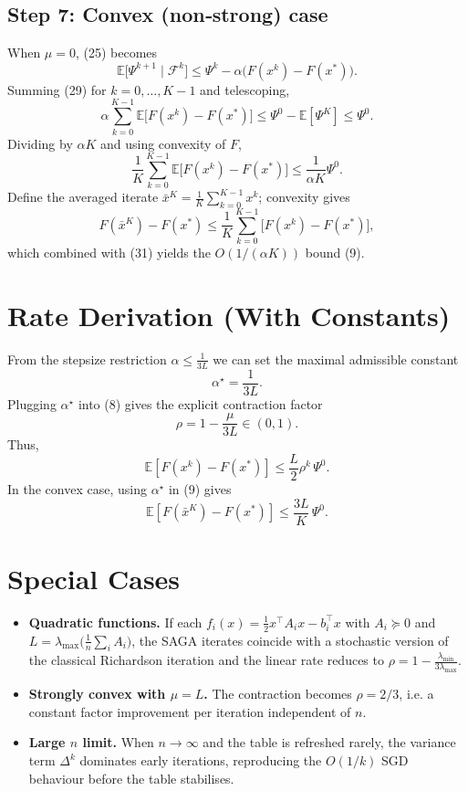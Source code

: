 \documentclass{article}
\newcommand{\E}{\mathbb{E}}
\begin{document}
\subsection*{Step 7: Convex (non‑strong) case}
When $\mu=0$, (25) becomes
\[
\E\!\bigl[\Psi^{k+1}\mid\mathcal{F}^{k}\bigr]
\le \Psi^{k}-\alpha\bigl(F(x^{k})-F(x^{*})\bigr).
\tag{29}
\]
Summing (29) for $k=0,\dots,K-1$ and telescoping,
\[
\alpha\sum_{k=0}^{K-1}\E\!\bigl[F(x^{k})-F(x^{*})\bigr]
\le \Psi^{0}-\E[\Psi^{K}]
\le \Psi^{0}.
\tag{30}
\]
Dividing by $\alpha K$ and using convexity of $F$,
\[
\frac{1}{K}\sum_{k=0}^{K-1}\E\!\bigl[F(x^{k})-F(x^{*})\bigr]
\le \frac{1}{\alpha K}\Psi^{0}.
\tag{31}
\]
Define the averaged iterate $\bar x^{K}= \frac1K\sum_{k=0}^{K-1}x^{k}$; convexity gives
\[
F(\bar x^{K})-F(x^{*})
\le \frac{1}{K}\sum_{k=0}^{K-1}\bigl[F(x^{k})-F(x^{*})\bigr],
\]
which combined with (31) yields the $O(1/(\alpha K))$ bound (9).

\section*{Rate Derivation (With Constants)}
From the stepsize restriction $\alpha\le \frac{1}{3L}$ we can set the maximal admissible constant
\[
\alpha^{\star}= \frac{1}{3L}.
\]
Plugging $\alpha^{\star}$ into (8) gives the explicit contraction factor
\[
\rho = 1-\frac{\mu}{3L}\in(0,1).
\]
Thus,
\[
\E[F(x^{k})-F(x^{*})]\le \frac{L}{2}\rho^{k}\,\Psi^{0}.
\]
In the convex case, using $\alpha^{\star}$ in (9) gives
\[
\E[F(\bar x^{K})-F(x^{*})]\le \frac{3L}{K}\,\Psi^{0}.
\]

\section*{Special Cases}
\begin{itemize}
\item \textbf{Quadratic functions.} If each $f_i(x)=\frac12 x^{\top}A_i x-b_i^{\top}x$ with $A_i\succeq 0$ and $L=\lambda_{\max}\!\bigl(\frac1n\sum_i A_i\bigr)$, the SAGA iterates coincide with a stochastic version of the classical Richardson iteration and the linear rate reduces to $\rho=1-\frac{\lambda_{\min}}{3\lambda_{\max}}$.
\item \textbf{Strongly convex with $\mu=L$.} The contraction becomes $\rho=2/3$, i.e. a constant factor improvement per iteration independent of $n$.
\item \textbf{Large $n$ limit.} When $n\rightarrow\infty$ and the table is refreshed rarely, the variance term $\Delta^{k}$ dominates early iterations, reproducing the $O(1/k)$ SGD behaviour before the table stabilises.
\end{itemize}
\end{document}
